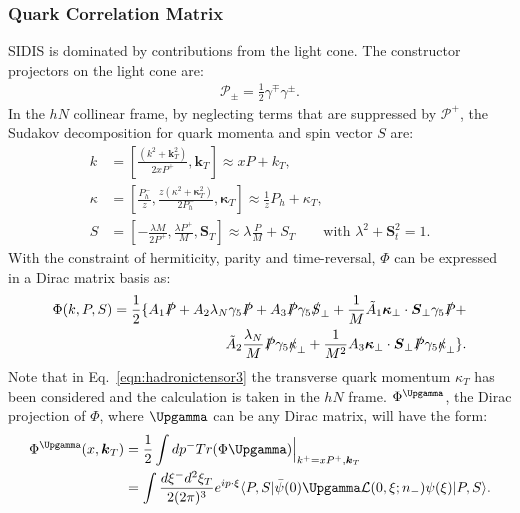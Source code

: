 \subsubsection{Quark Correlation Matrix} 
SIDIS is dominated by contributions from the light cone. The constructor projectors on the light cone are:
\begin{equation}
\begin{aligned}
\mathcal{P}_\pm=\frac{1}{2}\gamma^\mp\gamma^\pm.
\label{eqn:LC}
\end{aligned}
\end{equation}
In the $hN$ collinear frame, by neglecting terms that are suppressed by $\mathcal{P}^+$, the Sudakov decomposition for quark momenta and spin vector $S$ are:
\begin{equation}
\begin{aligned}
       k&=[\frac{(k^2+\boldsymbol{k}^2_T)}{2xP^+},\boldsymbol{k}_T] \approx xP+k_T, \\
       \kappa &=[\frac{P^-_h}{z},\frac{z(\kappa^2+\boldsymbol{\kappa}^2_T)}{2P^-_h},\boldsymbol{\kappa}_T]\approx \frac{1}{z}P_h+\kappa_T,  \\
       S&=[-\frac{\lambda M}{2P^+},\frac{\lambda P^+}{M},\boldsymbol{S}_T]\approx \lambda\frac{P}{M}+S_T  \qquad   \text{with } \lambda^2+\boldsymbol{S}_t^2=1.
\end{aligned}
\label{eqn:phi3}
\end{equation}
With the constraint of hermiticity, parity and time-reversal, $\Phi$ can be expressed in a Dirac matrix basis as:
\begin{equation}
\begin{aligned}
  \Phi(k,P,S)=\frac{1}{2}\{A_1\slashed{P}+A_2\lambda_N\gamma_5\slashed{P}+A_3\slashed{P}\gamma_5\slashed{S}_{\perp}+\frac{1}{M}\tilde{A}_1\boldsymbol{\kappa}_{\perp}\cdot\boldsymbol{S}_{\perp}\gamma_5\slashed{P}+ \\
\tilde{A}_2\frac{\lambda_N}{M}\slashed{P}\gamma_5\slashed{\kappa}_{\perp}+\frac{1}{M^2}{A}_3\boldsymbol{\kappa}_{\perp}\cdot\boldsymbol{S}_{\perp}\slashed{P}\gamma_5\slashed{\kappa}_{\perp}\}.\\
\label{eqn:phi2}
\end{aligned}
\end{equation}
Note that in Eq.~\eqref{eqn:hadronictensor3} the transverse quark momentum $\kappa_T$ has been considered and the calculation is taken in the $hN$ frame. $\Phi^{\Upgamma}$, the Dirac projection of $\Phi$,  where $\Upgamma$ can be any Dirac matrix, will have the form:
\begin{equation}
\begin{aligned}
  \Phi^{\Upgamma}(x,\boldsymbol{k}_T) &=\frac{1}{2}\int dp^-Tr(\Phi\Upgamma)\Big|_{k^+=xP^+,\boldsymbol{k}_T} \\
    &=\int \frac{d\xi^-d^2\xi_T}{2(2\pi)^3}e^{ip\cdot\xi}\langle P,S|\bar{\psi}(0)\Upgamma\mathcal{L}(0,\xi;n_-)\psi(\xi)|P,S\rangle.
\label{eqn:phidirac}
\end{aligned}
\end{equation}  
